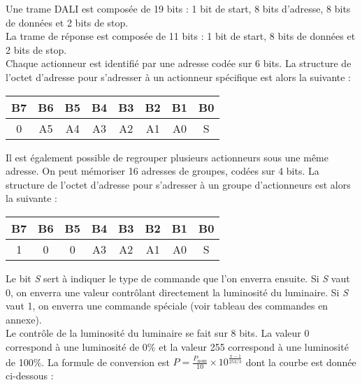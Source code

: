 	\begin{UPSTIactivite}
		\UPSTIeleveOnly{\vspace{6cm}}
	\end{UPSTIactivite}

	Une trame DALI est composée de 19 bits : 1 bit de start, 8 bits d'adresse, 8 bits de données et 2 bits de stop.\\ La trame de réponse est composée de 11 bits : 1 bit de start, 8 bits de données et 2 bits de stop.\\

	Chaque actionneur est identifié par une adresse codée sur 6 bits. La structure de l'octet d'adresse pour s'adresser à un actionneur spécifique est alors la suivante : 
	\begin{center}
		\begin{tabular}{|c|c|c|c|c|c|c|c|}
			\hline
			B7 & B6 & B5 & B4 & B3 & B2 & B1 & B0\\
			\hline
			0 & A5 & A4 & A3 & A2 & A1 & A0 & S\\
			\hline
		\end{tabular}
	\end{center}

	Il est également possible de regrouper plusieurs actionneurs sous une même adresse. On peut mémoriser 16 adresses de groupes, codées sur 4 bits. La structure de l'octet d'adresse pour s'adresser à un groupe d'actionneurs est alors la suivante :
	
	\begin{center}
		\begin{tabular}{|c|c|c|c|c|c|c|c|}
			\hline
			B7 & B6 & B5 & B4 & B3 & B2 & B1 & B0\\
			\hline
			1 & 0 & 0 & A3 & A2 & A1 & A0 & S\\
			\hline
		\end{tabular}
	\end{center}

	Le bit \textit{S} sert à indiquer le type de commande que l'on enverra ensuite. Si \textit{S} vaut 0, on enverra une valeur contrôlant directement la luminosité du luminaire. Si \textit{S} vaut 1, on enverra une commande spéciale (voir tableau des commandes en annexe).\\

	Le contrôle de la luminosité du luminaire se fait sur 8 bits. La valeur 0 correspond à une luminosité de 0\% et la valeur 255 correspond à une luminosité de 100\%. La formule de conversion est $P = \frac{P_{\text{nom}}}{10}\times10^{\frac{x-1}{253/3}}$ dont la courbe est donnée ci-dessous : 

